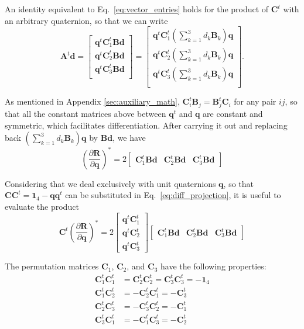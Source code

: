 \documentclass[aip,jcp,reprint,amsmath,amssymb,amsfont]{revtex4-1}
\newcommand{\mt}[1]{\boldsymbol{\mathbf{#1}}}           %
\newcommand{\vt}[1]{\boldsymbol{\mathbf{#1}}}           %
\newcommand{\tr}[1]{#1^t}                               %
\newcommand{\diff}[2]{\dfrac{\partial #1}{\partial #2}} %
\begin{document}
An identity equivalent to Eq.~\ref{eq:vector_entries} holds for the product of $\tr{\mt C}$ with an arbitrary quaternion, so that we can write
\[
\tr{\mt A}{\vt d} =
\left[\begin{array}{c}
\tr{\vt q}\tr{\mt C}_1 \mt B \vt d \\
\tr{\vt q}\tr{\mt C}_2 \mt B \vt d \\
\tr{\vt q}\tr{\mt C}_3 \mt B \vt d \\
\end{array}\right] = 
\left[\begin{array}{c}
\tr{\vt q} \tr{\mt C}_1 \left( \sum_{k=1}^3 d_k \mt B_k \right) \vt q \\
\tr{\vt q} \tr{\mt C}_2 \left( \sum_{k=1}^3 d_k \mt B_k \right) \vt q \\
\tr{\vt q} \tr{\mt C}_3 \left( \sum_{k=1}^3 d_k \mt B_k \right) \vt q \\
\end{array}\right].
\]

As mentioned in Appendix \ref{sec:auxiliary_math}, $\tr{\mt C}_i \mt B_j = \tr{\mt B}_j \mt C_i$ for any pair $ij$, so that all the constant matrices above between $\tr{\vt q}$ and $\vt q$ are constant and symmetric, which facilitates differentiation. After carrying it out and replacing back $(\sum_{k=1}^3 d_k \mt B_k) \vt q$ by $\mt B \vt d$, we have
\[
\left( \diff{\vt R}{\vt q} \right)^\ast = 2 \left[\begin{array}{ccc}
\tr{\mt C}_1 \mt B \vt d & \tr{\mt C}_2 \mt B \vt d & \tr{\mt C}_3 \mt B \vt d
\end{array}\right]
\]

Considering that we deal exclusively with unit quaternions $\vt q$, so that $\mt C \tr{\mt C} = \mt 1_4 - \vt q \tr{\vt q}$ can be substituted in Eq.~\ref{eq:diff_projection}, it is useful to evaluate the product
\[
\tr{\mt C} \left( \diff{\vt R}{\vt q} \right)^\ast = 2 \left[\begin{array}{c}
\tr{\vt q}\tr{\mt C_1} \\
\tr{\vt q}\tr{\mt C_2} \\
\tr{\vt q}\tr{\mt C_3}
\end{array}\right] \left[\begin{array}{ccc}
\tr{\mt C}_1 \mt B \vt d & \tr{\mt C}_2 \mt B \vt d & \tr{\mt C}_3 \mt B \vt d
\end{array}\right]
\]

The permutation matrices $\mt C_1$, $\mt C_2$, and $\mt C_3$ have the following properties:
\begin{equation}
\begin{aligned}
\tr{\mt C_1}\tr{\mt C_1} &= \tr{\mt C_2}\tr{\mt C_2} = \tr{\mt C_3}\tr{\mt C_3} = -\mt 1_4 \\
\tr{\mt C_1}\tr{\mt C_2} &= -\tr{\mt C_2}\tr{\mt C_1} = -\tr{\mt C_3} \\
\tr{\mt C_2}\tr{\mt C_3} &= -\tr{\mt C_3}\tr{\mt C_2} = -\tr{\mt C_1} \\
\tr{\mt C_3}\tr{\mt C_1} &= -\tr{\mt C_1}\tr{\mt C_3} = -\tr{\mt C_2}
\end{aligned}
\end{equation}
\end{document}
